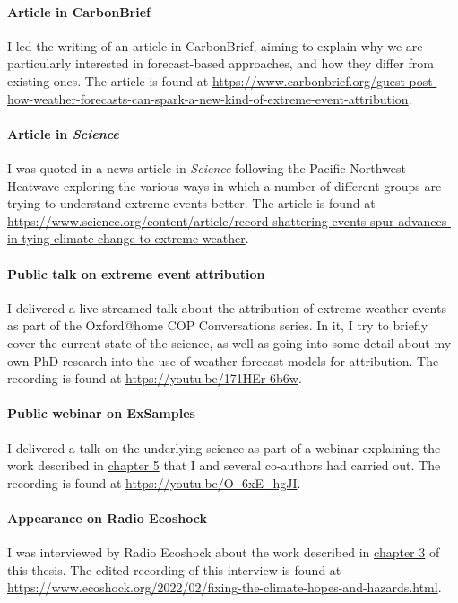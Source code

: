     \paragraph*{Article in CarbonBrief}
    
      I led the writing of an article in CarbonBrief, aiming to explain why we are particularly interested in forecast-based approaches, and how they differ from existing ones. The article is found at \url{https://www.carbonbrief.org/guest-post-how-weather-forecasts-can-spark-a-new-kind-of-extreme-event-attribution}.

    \paragraph*{Article in \emph{Science}}
    
      I was quoted in a news article in \emph{Science} following the Pacific Northwest Heatwave exploring the various ways in which a number of different groups are trying to understand extreme events better. The article is found at \url{https://www.science.org/content/article/record-shattering-events-spur-advances-in-tying-climate-change-to-extreme-weather}.

    \paragraph*{Public talk on extreme event attribution}
    
      I delivered a live-streamed talk about the attribution of extreme weather events as part of the Oxford@home COP Conversations series. In it, I try to briefly cover the current state of the science, as well as going into some detail about my own PhD research into the use of weather forecast models for attribution. The recording is found at \url{https://youtu.be/171HEr-6b6w}.

    \paragraph*{Public webinar on ExSamples}
    
      I delivered a talk on the underlying science as part of a webinar explaining the work described in \hyperref[ch5]{chapter 5} that I and several co-authors had carried out. The recording is found at \url{https://youtu.be/O--6xE_hgJI}.

    \paragraph*{Appearance on Radio Ecoshock}
    
      I was interviewed by Radio Ecoshock about the work described in \hyperref[ch3]{chapter 3} of this thesis. The edited recording of this interview is found at \url{https://www.ecoshock.org/2022/02/fixing-the-climate-hopes-and-hazards.html}.